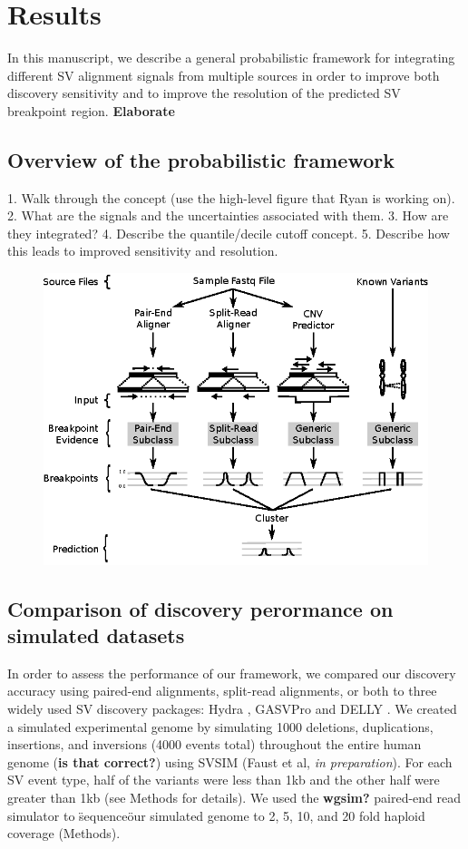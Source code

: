 \documentclass[11pt]{article}
\begin{document}
\section{Results}

In this manuscript, we describe a general probabilistic framework for 
integrating different SV alignment signals from multiple sources in order 
to improve both discovery sensitivity and to improve the resolution of the 
predicted SV breakpoint region.
\textbf{Elaborate}

\subsection{Overview of the probabilistic framework}
1. Walk through the concept (use the high-level figure that Ryan is working on).
2. What are the signals and the uncertainties associated with them.
3. How are they integrated?
4. Describe the quantile/decile cutoff concept.
5. Describe how this leads to improved sensitivity and resolution.

\begin{figure}
\includegraphics{Workflow.eps}
\end{figure}


\subsection{Comparison of discovery perormance on simulated datasets}
In order to assess the performance of our framework, we compared our discovery
accuracy using paired-end alignments, split-read alignments, or both to 
three widely used SV discovery packages: Hydra \cite{Quinlan2010},
GASVPro \cite{Sindi2012} and DELLY \cite{Rausch2012b}. We created a simulated 
experimental genome by simulating 1000 deletions, duplications, insertions, 
and inversions (4000 events total) throughout the entire human genome
(\textbf{is that correct?}) using SVSIM (Faust et al, \emph{in preparation}). 
For each SV event type, half of the variants were less than 1kb and the other 
half were greater than 1kb (see Methods for details).  We used the 
\textbf{wgsim?} paired-end read simulator to \"sequence\" our simulated 
genome to 2, 5, 10, and 20 fold haploid coverage (Methods).
\end{document}
